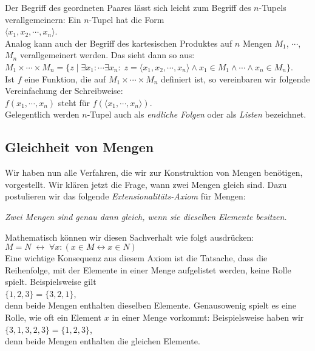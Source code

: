 Der Begriff des geordneten Paares lässt sich leicht zum Begriff des $n$-Tupels verallgemeinern:
Ein $n$-Tupel hat die Form \\[0.2cm]
\hspace*{1.3cm} $\langle x_1, x_2, \cdots, x_n \rangle$. \\[0.2cm]
Analog kann auch der Begriff des kartesischen Produktes auf $n$ Mengen $M_1$, $\cdots$, $M_n$
verallgemeinert werden. Das sieht dann so aus: \\[0.2cm]
\hspace*{1.3cm} $M_1 \times \cdots \times M_n =\big\{ z \mid \exists x_1\colon
\cdots \exists x_n \colon \; z = \langle x_1,x_2,\cdots,x_n \rangle \wedge x_1
\in M_1 \wedge \cdots \wedge x_n \in M_n \big\}$. \\[0.2cm]
Ist $f$ eine Funktion, die auf $M_1 \times \cdots \times M_n$ definiert ist,
so vereinbaren wir folgende Vereinfachung der Schreibweise:
\\[0.2cm]
\hspace*{1.3cm} 
$f(x_1, \cdots, x_n)$ \quad steht für \quad $f(\langle x_1, \cdots, x_n\rangle)$. 
\\[0.2cm]
Gelegentlich werden $n$-Tupel auch als \emph{endliche Folgen} oder als
\emph{Listen} bezeichnet.  

\subsection{Gleichheit von Mengen}
Wir haben nun alle Verfahren, die wir zur Konstruktion von Mengen benötigen, vorgestellt.
 Wir klären jetzt die Frage, wann zwei Mengen gleich sind.  Dazu
postulieren wir das folgende \emph{Extensionalitäts-Axiom} für Mengen: 
\begin{center}
 {\sl Zwei Mengen sind genau dann gleich, wenn sie dieselben Elemente besitzen.}
\end{center}
Mathematisch können wir diesen Sachverhalt wie folgt ausdrücken: \\[0.2cm]
\hspace*{1.3cm} $M = N \;\leftrightarrow\; \forall x: (x \in M \leftrightarrow x \in N)$ \\[0.2cm]
Eine wichtige Konsequenz aus diesem Axiom ist die Tatsache, dass die Reihenfolge, mit der
Elemente in einer Menge aufgelistet werden, keine Rolle spielt.  Beispielsweise gilt \\[0.2cm]
\hspace*{1.3cm} $\{1,2,3\} = \{3,2,1\}$, \\[0.2cm]
denn beide Mengen enthalten dieselben Elemente.  Genausowenig spielt es eine Rolle,
wie oft ein Element $x$ in einer Menge vorkommt:  Beispielsweise haben wir
\\[0.2cm]
\hspace*{1.3cm}
$\{3,1,3,2,3\} = \{1,2,3\}$,
\\[0.2cm]
denn beide Mengen enthalten die gleichen Elemente. 


